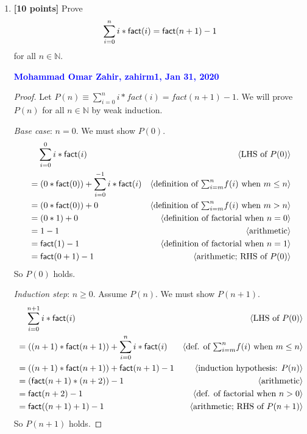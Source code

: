 \documentclass[11pt,fleqn]{article}
\newcommand{\mname}[1]{\mbox{\sf #1}}
\newcommand{\pnote}[1]{{\langle \text{#1} \rangle}}
\begin{document}
\begin{enumerate}

  \item \textbf{[10 points]} Prove \[\sum^{n}_{i = 0} i *
    \mname{fact}(i) = \mname{fact}(n+1) - 1\] for all $n \in
    \mathbb{N}$.

  \bigskip

  \textcolor{blue}{\textbf{Mohammad Omar Zahir, zahirm1, Jan 31, 2020}}

  \begin{proof}
    Let $P(n) \equiv \sum^{n}_{i=0}i * fact(i) = fact(n + 1) - 1$.  We will prove $P(n)$
    for all $n \in \mathbb{N}$ by weak induction.
    
    \medskip
    
    \emph{Base case}: $n = 0$.  We must show $P(0)$.
    \begin{align*}
      &\phantom{{}=} \sum_{i=0}^{0} i * \mname{fact}(i) & \pnote{LHS of $P(0)$}\\
      &= (0 * \mname{fact}(0)) + \sum_{i=0}^{-1} i * \mname{fact}(i)          & \pnote{definition of $\textstyle{\sum}_{i=m}^{n} f(i)$ when $m \le n$}\\
      &= (0 * \mname{fact}(0)) + 0          & \pnote{definition of $\textstyle{\sum}_{i=m}^{n} f(i)$ when $m > n$}\\
      &= (0 * 1) + 0          & \pnote{definition of factorial when $n = 0$}\\
      &= 1 - 1    & \pnote{arithmetic}\\
      &= \mname{fact}(1) - 1    & \pnote{definition of factorial when $n = 1$}\\
      &= \mname{fact}(0+1) - 1    & \pnote{arithmetic; RHS of $P(0)$}\\
    \end{align*}
    So $P(0)$ holds.
    
    \medskip
    
    \emph{Induction step}: $n \ge 0$. Assume $P(n)$. We must show $P(n + 1)$.
    \begin{align*}
      &\phantom{{}=} \sum_{i=0}^{n+1} i * \mname{fact}(i) & \pnote{LHS of $P(0)$}\\
      &= ((n+1) * \mname{fact} (n+1)) + \sum_{i=0}^{n} i * \mname{fact}(i)   & \pnote{def. of $\textstyle{\sum}_{i=m}^{n} f(i)$ when $m \le n$}\\
      &= ((n+1) * \mname{fact} (n+1)) + \mname{fact}(n+1)-1   & \pnote{induction hypothesis: $P(n)$}\\
      &= (\mname{fact}(n+1)*(n+2)) -1          & \pnote{arithmetic}\\
      &= \mname{fact}(n+2) - 1    & \pnote{def. of factorial when $n > 0$}\\
      &= \mname{fact}((n+1)+1) - 1    & \pnote{arithmetic; RHS of $P(n+1)$}\\
    \end{align*}
    So $P(n + 1)$ holds.
    

\end{proof}
\end{enumerate}
\end{document}

